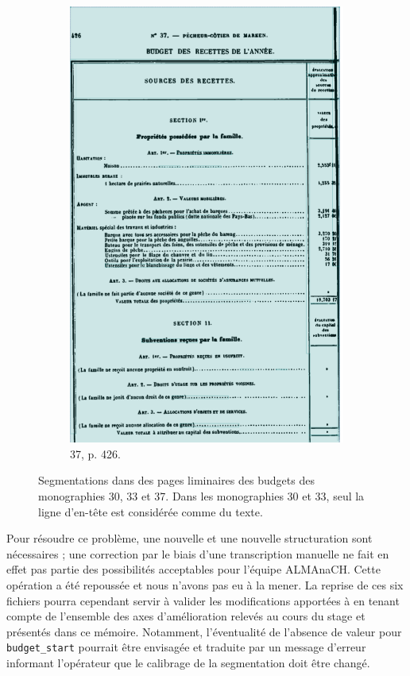 \begin{figure}[t]
\begin{subfigure}{0.3\textwidth}
     \includegraphics[width=1\linewidth]{img/transkribus_37.png}
     \caption{\no{}37, p. 426.}
     \label{fig:odm37tkb}
    \end{subfigure}
    \caption[Segmentation défectueuse dans \transkribus{}]{Segmentations dans \transkribus{} des pages liminaires des budgets des monographies \no{}30,  33 et 37. Dans les monographies 30 et 33, seul la ligne d'en-tête est considérée comme du texte.}
    \label{fig:odmtkbs1t4}
\end{figure}

Pour résoudre ce problème, une nouvelle \ocr{} et une nouvelle structuration sont nécessaires ; une correction par le biais d'une transcription manuelle ne fait en effet pas partie des possibilités acceptables pour l'équipe ALMAnaCH. Cette opération a été repoussée et nous n'avons pas eu à la mener. La reprise de ces six fichiers pourra cependant servir à valider les modifications apportées à \lse{} en tenant compte de l'ensemble des axes d'amélioration relevés au cours du stage et présentés dans ce mémoire. Notamment, l'éventualité de l'absence de valeur pour \texttt{budget\_start} pourrait 
être envisagée et traduite par un message d'erreur informant l'opérateur que le calibrage de la segmentation doit être changé.

